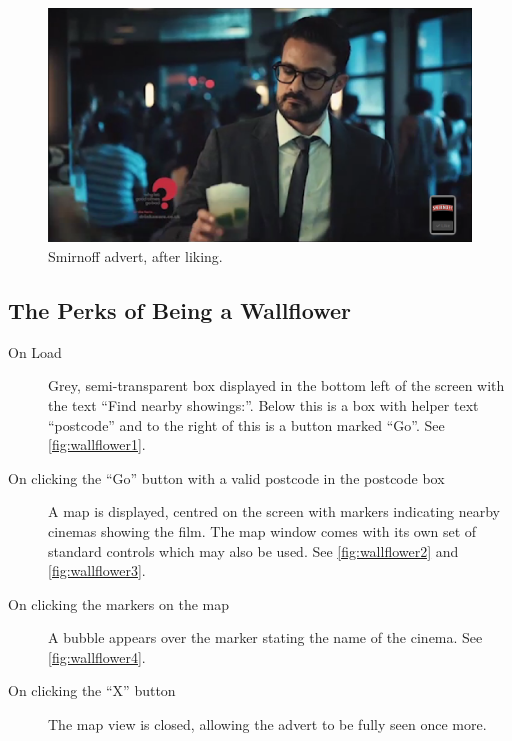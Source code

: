 	\begin{figure}[th]
		\centering
		\includegraphics[width=\textwidth,height=0.5\textheight,keepaspectratio]{images/adverts/smirnoff-2.png}
		\caption{Smirnoff advert, after liking.}
		\label{fig:smirnoff2}
	\end{figure}

\clearpage
\subsection{The Perks of Being a Wallflower}
	\begin{description}
		\item[On Load]{Grey, semi-transparent box displayed in the bottom left of the screen with the text ``Find nearby showings:''. Below this is a box with helper text ``postcode'' and to the right of this is a button marked ``Go''. See \ref{fig:wallflower1}.}
		\item[On clicking the ``Go'' button with a valid postcode in the postcode box]{A map is displayed, centred on the screen with markers indicating nearby cinemas showing the film. The map window comes with its own set of standard controls which may also be used. See \ref{fig:wallflower2} and \ref{fig:wallflower3}.}
		\item[On clicking the markers on the map]{A bubble appears over the marker stating the name of the cinema. See \ref{fig:wallflower4}.}
		\item[On clicking the ``X'' button]{The map view is closed, allowing the advert to be fully seen once more.}
	\end{description}


